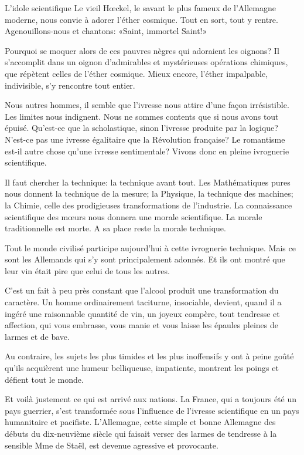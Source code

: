 \begin{chapter}{L'idole scientifique}
Le vieil Hœckel, le savant le plus fameux de l'Allemagne moderne,
nous convie à adorer l'éther cosmique. Tout en sort, tout y rentre.
Agenouillons-nous et chantons: «Saint, immortel Saint!»

Pourquoi se moquer alors de ces pauvres nègres qui adoraient les
oignons? Il s'accomplit dans un oignon d'admirables et mystérieuses
opérations chimiques, que répètent celles de l'éther cosmique. Mieux
encore, l'éther impalpable, indivisible, s'y rencontre tout entier.

Nous autres hommes, il semble que l'ivresse nous attire d'une façon
irrésistible. Les limites nous indignent. Nous ne sommes contents que si
nous avons tout épuisé. Qu'est-ce que la scholastique, sinon l'ivresse
produite par la logique? N'est-ce pas une ivresse égalitaire que la
Révolution française? Le romantisme est-il autre chose qu'une ivresse
sentimentale? Vivons donc en pleine ivrognerie scientifique.

Il faut chercher la technique: la technique avant tout. Les
Mathématiques pures nous donnent la technique de la mesure; la Physique,
la technique des machines; la Chimie, celle des prodigieuses
transformations de l'industrie. La connaissance scientifique des
mœurs nous donnera une morale scientifique. La morale traditionnelle
est morte. A sa place reste la morale technique.

Tout le monde civilisé participe aujourd'hui à cette ivrognerie
technique. Mais ce sont les Allemands qui s'y sont principalement
adonnés. Et ils ont montré que leur vin était pire que celui de tous les
autres.

C'est un fait à peu près constant que l'alcool produit une
transformation du caractère. Un homme ordinairement taciturne,
insociable, devient, quand il a ingéré une raisonnable quantité de vin,
un joyeux compère, tout tendresse et affection, qui vous embrasse, vous
manie et vous laisse les épaules pleines de larmes et de bave.

Au contraire, les sujets les plus timides et les plus inoffensifs y ont
à peine goûté qu'ils acquièrent une humeur belliqueuse, impatiente,
montrent les poings et défient tout le monde.

Et voilà justement ce qui est arrivé aux nations. La France, qui a
toujours été un pays guerrier, s'est transformée sous l'influence de
l'ivresse scientifique en un pays humanitaire et pacifiste. L'Allemagne,
cette simple et bonne Allemagne des débuts du dix-neuvième siècle qui
faisait verser des larmes de tendresse à la sensible Mme de Staël, est
devenue agressive et provocante.


\end{chapter}
